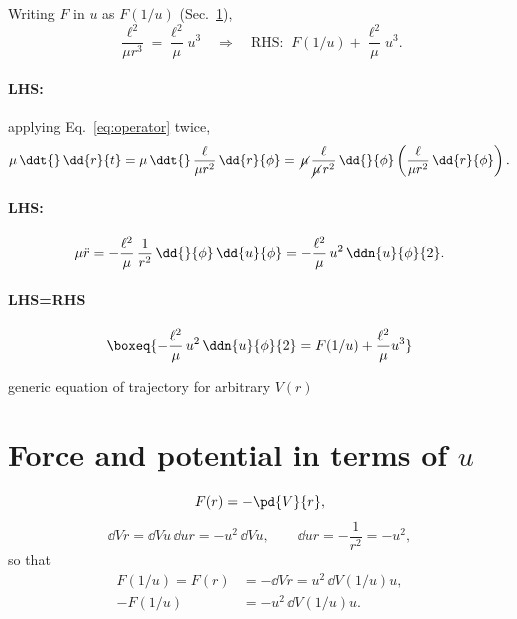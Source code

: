\documentclass[11pt]{article}
\begin{document}
Writing $F$ in $u$ as $F(1/u)$ (Sec.~\ref{sec:force}),
\begin{equation}
  \frac{\ell^{2}}{\mu r^{3}} = \frac{\ell^{2}}{\mu}u^{3}
  \quad\Longrightarrow\quad
  \text{RHS:}\;\; F(1/u) + \frac{\ell^{2}}{\mu}u^{3}.
\end{equation}

\paragraph{LHS:} applying Eq.~\eqref{eq:operator} twice,
\begin{equation}
  \mu\,\ddt{}\,\dd{r}{t}
    = \mu\,\ddt{}\,\frac{\ell}{\mu r^{2}}\,\dd{r}{\phi}
    = \,\cancel{\mu}\,\frac{\ell}{\cancel{\mu}\, r^{2}}\,\dd{}{\phi}
      \left(\frac{\ell}{\mu r^{2}}\,\dd{r}{\phi}\right).
\end{equation}

\paragraph{LHS:}
\begin{equation}
  \mu\ddot{r}
    = -\frac{\ell^{2}}{\mu}\,\frac{1}{r^{2}}\,\dd{}{\phi}\,\dd{u}{\phi}
    = -\frac{\ell^{2}}{\mu}\,u^{2}\,\ddn{u}{\phi}{2}.
\end{equation}

\paragraph{LHS=RHS}
\begin{equation}
  \boxeq{-\frac{\ell^{2}}{\mu}\,u^{2}\,\ddn{u}{\phi}{2}
         = F(1/u) + \frac{\ell^{2}}{\mu}u^{3}}
  \label{eq:generic}
\end{equation}
\begin{center}
  generic equation of trajectory for arbitrary $V(r)$
\end{center}

\section{Force and potential in terms of \texorpdfstring{$u$}{u}}
\label{sec:force}

\begin{equation}
  F(r) = -\pd{V}{r},
\end{equation}
\begin{equation}
  \dd{V}{r} = \dd{V}{u}\,\dd{u}{r} = -u^{2}\,\dd{V}{u},
  \qquad
  \dd{u}{r} = -\frac{1}{r^{2}} = -u^{2},
\end{equation}
so that
\begin{align}
  F(1/u) = F(r) &= -\dd{V}{r} = u^{2}\,\dd{V(1/u)}{u},\\[4pt]
  -F(1/u) &= -u^{2}\,\dd{V(1/u)}{u}.
\end{align}
\end{document}
